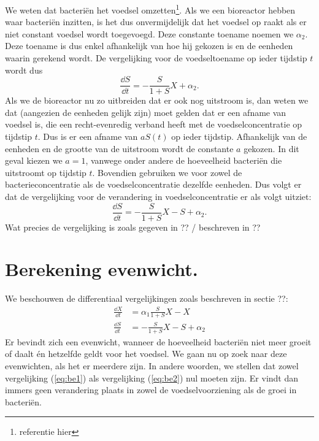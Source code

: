 
We weten dat bacteri\"en het voedsel omzetten\footnote{referentie hier}. Als we een bioreactor hebben waar bacteri\"en inzitten, is het dus onvermijdelijk dat het voedsel op raakt als er niet constant voedsel wordt toegevoegd. Deze constante toename noemen we $\alpha_2$. Deze toename is dus enkel afhankelijk van hoe hij gekozen is en de eenheden waarin gerekend wordt. De vergelijking voor de voedseltoename op ieder tijdstip $t$ wordt dus
\begin{equation*}
	\frac{\dd S}{\dd t} = -\frac{S}{1 + S} X + \alpha_2.
\end{equation*}
Als we de bioreactor nu zo uitbreiden dat er ook nog uitstroom is, dan weten we dat (aangezien de eenheden gelijk zijn) moet gelden dat er een afname van voedsel is, die een recht-evenredig verband heeft met de voedselconcentratie op tijdstip $t$. Dus is er een afname van $a S(t)$ op ieder tijdstip. Afhankelijk van de eenheden en de grootte van de uitstroom wordt de constante $a$ gekozen. In dit geval kiezen we $a = 1$, vanwege onder andere de hoeveelheid bacteri\"en die uitstroomt op tijdstip $t$. Bovendien gebruiken we voor zowel de bacterieconcentratie als de voedselconcentratie dezelfde eenheden. Dus volgt er dat de vergelijking voor de verandering in voedselconcentratie er als volgt uitziet:
\begin{equation}
	\frac{\dd S}{\dd t} = -\frac{S}{1 + S} X - S + \alpha_2.
\end{equation}
Wat precies de vergelijking is zoals gegeven in ?? / beschreven in ??

\section{Berekening evenwicht.}
We beschouwen de differentiaal vergelijkingen zoals beschreven in sectie ??: %
\begin{align}
	\frac{\dd X}{\dd t} &= \alpha_1 \frac{S}{1 + S} X - X 			\label{eq:be1}	\\
	\frac{\dd S}{\dd t} &= - \frac{S}{1 + S}X - S + \alpha_2 		\label{eq:be2}
\end{align}
Er bevindt zich een evenwicht, wanneer de hoeveelheid bacteri\"en niet meer groeit of daalt \'en hetzelfde geldt voor het voedsel. We gaan nu op zoek naar deze evenwichten, als het er meerdere zijn. In andere woorden, we stellen dat zowel vergelijking (\ref{eq:be1}) als vergelijking (\ref{eq:be2}) nul moeten zijn. Er vindt dan immers geen verandering plaats in zowel de voedselvoorziening als de groei in bacteri\"en. 

